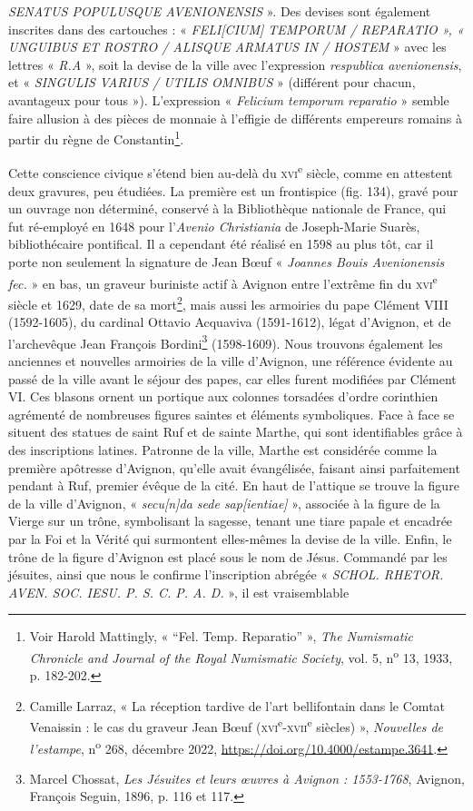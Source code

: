 \documentclass[12pt,twoside,openany]{book}
\begin{document}
\textit{SENATUS POPULUSQUE AVENIONENSIS} ». Des devises sont également inscrites dans des cartouches : « \textit{FELI[CIUM] TEMPORUM / REPARATIO », « UNGUIBUS ET ROSTRO / ALISQUE ARMATUS IN / HOSTEM} » avec les lettres « \textit{R.A} », soit la devise de la ville avec l’expression \textit{respublica avenionensis}, et « \textit{SINGULIS VARIUS / UTILIS OMNIBUS} » (différent pour chacun, avantageux pour tous »). L’expression « \textit{Felicium temporum reparatio} » semble faire allusion à des pièces de monnaie à l’effigie de différents empereurs romains à partir du règne de Constantin\footnote{Voir Harold Mattingly, « “Fel. Temp. Reparatio” », \textit{The Numismatic Chronicle and Journal of the Royal Numismatic Society}, vol. 5, n\textsuperscript{o} 13, 1933, p. 182-202.}.

Cette conscience civique s’étend bien au-delà du \textsc{xvi}\textsuperscript{e} siècle, comme en attestent deux gravures, peu étudiées. La première est un frontispice (fig. 134), gravé pour un ouvrage non déterminé, conservé à la Bibliothèque nationale de France, qui fut ré-employé en 1648 pour l’\textit{Avenio Christiania} de Joseph-Marie Suarès, bibliothécaire pontifical. Il a cependant été réalisé en 1598 au plus tôt, car il porte non seulement la signature de Jean Bœuf « \textit{Joannes Bouis Avenionensis fec.} » en bas, un graveur buriniste actif à Avignon entre l’extrême fin du \textsc{xvi}\textsuperscript{e} siècle et 1629, date de sa mort\footnote{Camille Larraz, « La réception tardive de l’art bellifontain dans le Comtat Venaissin : le cas du graveur Jean Bœuf (\textsc{xvi}\textsuperscript{e}-\textsc{xvii}\textsuperscript{e} siècles) », \textit{Nouvelles de l’estampe}, n\textsuperscript{o} 268, décembre 2022, \href{https://doi.org/10.4000/estampe.3641}{https://doi.org/10.4000/estampe.3641}.}, mais aussi les armoiries du pape Clément VIII (1592-1605), du cardinal Ottavio Acquaviva (1591-1612), légat d’Avignon, et de l’archevêque Jean François Bordini\footnote{Marcel Chossat, \textit{Les Jésuites et leurs œuvres à Avignon : 1553-1768}, Avignon, François Seguin, 1896, p. 116 et 117.} (1598-1609). Nous trouvons également les anciennes et nouvelles armoiries de la ville d’Avignon, une référence évidente au passé de la ville avant le séjour des papes, car elles furent modifiées par Clément VI. Ces blasons ornent un portique aux colonnes torsadées d’ordre corinthien agrémenté de nombreuses figures saintes et éléments symboliques. Face à face se situent des statues de saint Ruf et de sainte Marthe, qui sont identifiables grâce à des inscriptions latines. Patronne de la ville, Marthe est considérée comme la première apôtresse d’Avignon, qu’elle avait évangélisée, faisant ainsi parfaitement pendant à Ruf, premier évêque de la cité. En haut de l’attique se trouve la figure de la ville d’Avignon, « \textit{secu[n]da sede sap[ientiae]} », associée à la figure de la Vierge sur un trône, symbolisant la sagesse, tenant une tiare papale et encadrée par la Foi et la Vérité qui surmontent elles-mêmes la devise de la ville. Enfin, le trône de la figure d’Avignon est placé sous le nom de Jésus. Commandé par les jésuites, ainsi que nous le confirme l’inscription abrégée « \textit{SCHOL. RHETOR. AVEN. SOC. IESU. P. S. C. P. A. D.} », il est vraisemblable 
\end{document}
